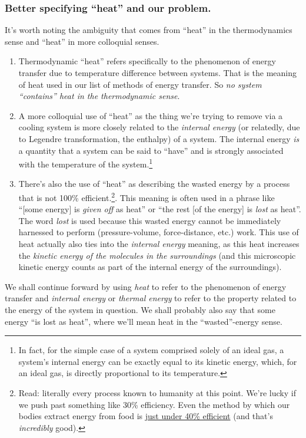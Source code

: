 \documentclass[../main/main.tex]{subfiles}
\begin{document}
\subsubsection{Better specifying ``heat'' and our problem.}

It's worth noting the ambiguity that comes from 
``heat'' in the thermodynamics sense and ``heat''
in more colloquial senses.
\begin{enumerate}
    \item
    Thermodynamic ``heat'' refers specifically to the phenomenon of energy
    transfer due to temperature difference between systems.
    That is the meaning of heat used in our list of methods of energy transfer.
    So \emph{no system ``contains'' heat in the thermodynamic sense}.
    \item 
    A more colloquial use of ``heat'' as the thing we're trying to remove
    via a cooling system is more closely related to the \emph{internal energy}
    (or relatedly, due to Legendre transformation, the enthalpy)
    of a system. The internal energy \emph{is} a quantity that a system
    can be said to ``have'' and is strongly associated with the temperature
    of the system.\footnote
    {
        In fact, for the simple case of a system comprised solely of an ideal gas,
        a system's internal energy can be exactly equal to its kinetic energy,
        which, for an ideal gas, is directly proportional to its temperature.
    }
    \item
    There's also the use of ``heat'' as describing the wasted energy by a
    process that is not 100\% efficient.\footnote
    {
        Read: literally every process
        known to humanity at this point. We're
        lucky if we push past something like 
        30\% efficiency.
        Even the method by which our bodies extract
        energy from food is
        \href{http://history.cpet.ufl.edu/lm/respiration/efficiency01.html}
        {just under 40\% efficient} (and that's
        \emph{incredibly} good).
    }. This meaning is often used in a phrase
    like ``[some energy] is \emph{given off} as heat'' or
    ``the rest [of the energy] is \emph{lost} as heat''.
    The word \emph{lost} is used because this wasted energy cannot be
    immediately harnessed to perform (pressure-volume, force-distance, etc.)
    work. This use of heat actually also ties into the \emph{internal energy}
    meaning, as this heat increases the \emph{kinetic energy of the molecules
    in the surroundings} (and this microscopic kinetic energy counts as
    part of the internal energy of the surroundings).
\end{enumerate}
We shall continue forward by using \emph{heat} to refer to the phenomenon
of energy transfer and \emph{internal energy} or \emph{thermal energy}
to refer to the property
related to the energy of the system in question. We shall probably
also say that some energy ``is lost as heat'', where we'll mean
heat in the ``wasted''-energy sense.\par
\end{document}

